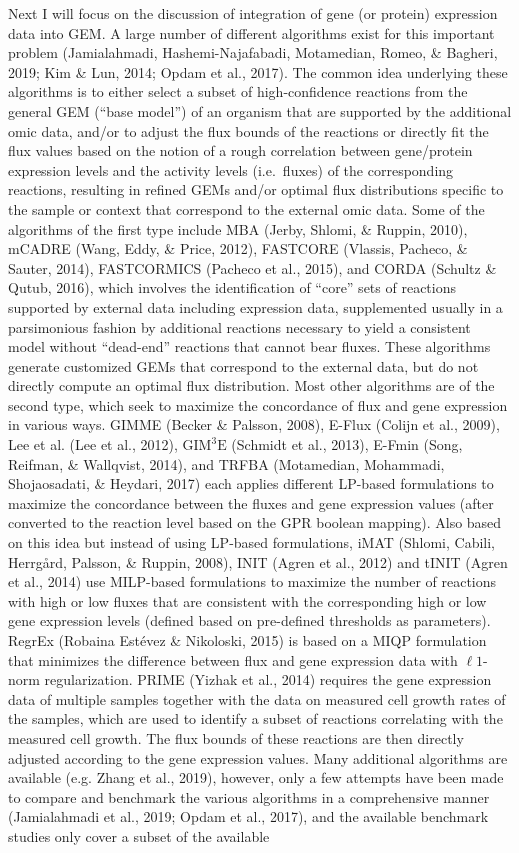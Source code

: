 \documentclass[12pt,twoside,openany,\mydriver]{thesis}  %
\begin{document}
Next I will focus on the discussion of integration of gene (or protein) expression data into GEM. A large number of different algorithms exist for this important problem (Jamialahmadi, Hashemi-Najafabadi, Motamedian, Romeo, \& Bagheri, 2019; Kim \& Lun, 2014; Opdam et al., 2017). The common idea underlying these algorithms is to either select a subset of high-confidence reactions from the general GEM (``base model'') of an organism that are supported by the additional omic data, and/or to adjust the flux bounds of the reactions or directly fit the flux values based on the notion of a rough correlation between gene/protein expression levels and the activity levels (i.e.~fluxes) of the corresponding reactions, resulting in refined GEMs and/or optimal flux distributions specific to the sample or context that correspond to the external omic data. Some of the algorithms of the first type include MBA (Jerby, Shlomi, \& Ruppin, 2010), mCADRE (Wang, Eddy, \& Price, 2012), FASTCORE (Vlassis, Pacheco, \& Sauter, 2014), FASTCORMICS (Pacheco et al., 2015), and CORDA (Schultz \& Qutub, 2016), which involves the identification of ``core'' sets of reactions supported by external data including expression data, supplemented usually in a parsimonious fashion by additional reactions necessary to yield a consistent model without ``dead-end'' reactions that cannot bear fluxes. These algorithms generate customized GEMs that correspond to the external data, but do not directly compute an optimal flux distribution. Most other algorithms are of the second type, which seek to maximize the concordance of flux and gene expression in various ways. GIMME (Becker \& Palsson, 2008), E-Flux (Colijn et al., 2009), Lee et al. (Lee et al., 2012), \(\text{GIM}^3\text{E}\) (Schmidt et al., 2013), E-Fmin (Song, Reifman, \& Wallqvist, 2014), and TRFBA (Motamedian, Mohammadi, Shojaosadati, \& Heydari, 2017) each applies different LP-based formulations to maximize the concordance between the fluxes and gene expression values (after converted to the reaction level based on the GPR boolean mapping). Also based on this idea but instead of using LP-based formulations, iMAT (Shlomi, Cabili, Herrgård, Palsson, \& Ruppin, 2008), INIT (Agren et al., 2012) and tINIT (Agren et al., 2014) use MILP-based formulations to maximize the number of reactions with high or low fluxes that are consistent with the corresponding high or low gene expression levels (defined based on pre-defined thresholds as parameters). RegrEx (Robaina Estévez \& Nikoloski, 2015) is based on a MIQP formulation that minimizes the difference between flux and gene expression data with \(\ell 1\)-norm regularization. PRIME (Yizhak et al., 2014) requires the gene expression data of multiple samples together with the data on measured cell growth rates of the samples, which are used to identify a subset of reactions correlating with the measured cell growth. The flux bounds of these reactions are then directly adjusted according to the gene expression values. Many additional algorithms are available (e.g. Zhang et al., 2019), however, only a few attempts have been made to compare and benchmark the various algorithms in a comprehensive manner (Jamialahmadi et al., 2019; Opdam et al., 2017), and the available benchmark studies only cover a subset of the available 
\end{document}
